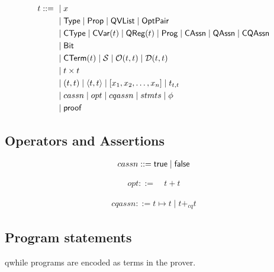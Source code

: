 \begin{definition}
    \begin{align*}
        t ::=\ & \mid x \\
        & \mid \textsf{Type} \mid \textsf{Prop} \mid \textsf{QVList} \mid \textsf{OptPair} \\
        & \mid \textsf{CType} \mid \textsf{CVar}(t) \mid \textsf{QReg}(t) \mid \textsf{Prog} \mid \textsf{CAssn} \mid \textsf{QAssn} \mid \textsf{CQAssn} \\
        & \mid \textsf{Bit} \\
        & \mid \textsf{CTerm}(t) \mid \mathcal{S} \mid \mathcal{O}(t, t) \mid \mathcal{D}(t, t) \\
        & \mid t \times t  \\ 
        & \mid (t, t) \mid \langle t, t \rangle \mid [x_1, x_2, \dots, x_n] \mid t_{t,t} \\
        & \mid cassn \mid opt \mid cqassn \mid stmts \mid \phi \\
        & \mid \textsf{proof}
    \end{align*}
\end{definition}

\subsection{Operators and Assertions}

\begin{definition}
    \begin{align*}
        cassn ::= \textsf{true} \mid \textsf{false}
    \end{align*}
\end{definition}

\begin{definition}
    \begin{align*}
        opt ::= & \ t + t
    \end{align*}
\end{definition}

\begin{definition}
    \begin{align*}
        cqassn ::= t\mapsto t \mid t +_{cq} t
    \end{align*}
\end{definition}

\subsection{Program statements}
qwhile programs are encoded as terms in the prover.

\newcommand{\rndarrow}{%
  \stackrel{\raisebox{-.25ex}[.25ex]%
   {\tiny $\mathdollar$}}{\raisebox{-.25ex}[.25ex]{$\leftarrow$}}}

